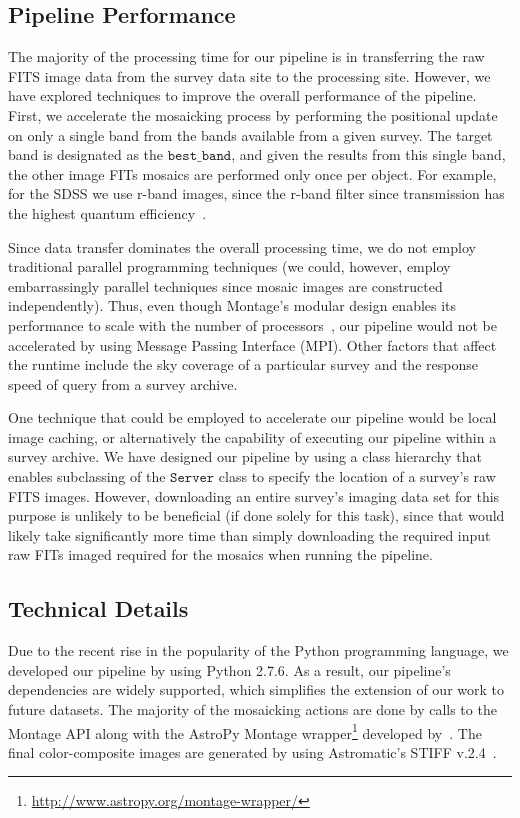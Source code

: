 \documentclass[authoryear, 12pt, 5p, times]{elsarticle}
\begin{document}
\subsection{Pipeline Performance}	

The majority of the processing time for our pipeline is in transferring the raw FITS image data from the survey data site to the processing site. However, we have explored techniques to improve the overall performance of the pipeline. First, we accelerate the mosaicking process by performing the positional update on only a single band from the bands available from a given survey. The target band is designated as the $\texttt{best\_band}$, and given the results from this single band, the other image FITs mosaics are performed only once per object. For example, for the SDSS we use r-band images, since the r-band filter since transmission has the highest quantum efficiency~\citep{edr}.

Since data transfer dominates the overall processing time, we do not employ traditional parallel programming techniques (we could, however, employ embarrassingly parallel techniques since mosaic images are constructed independently). Thus, even though Montage's modular design enables its performance to scale with the number of processors~\citep{montage}, our pipeline would not be accelerated by using  Message Passing Interface (MPI).  Other factors that affect the runtime include the sky coverage of a particular survey and the response speed of query from a survey archive.

One technique that could be employed to accelerate our pipeline would be local image caching, or alternatively the capability of executing our pipeline within a survey archive. We have designed our pipeline by using a class hierarchy that enables subclassing of the $\texttt{Server}$ class to specify the location of a survey's raw FITS images. However, downloading an entire survey's imaging data set for this purpose is unlikely to be beneficial (if done solely for this task), since that would likely take significantly more time than simply downloading the required input raw FITs imaged required for the mosaics when running the pipeline.

\subsection{Technical Details}

Due to the recent rise in the popularity of the Python programming language, we developed our pipeline by using Python 2.7.6. As a result, our pipeline's dependencies are widely supported, which simplifies the extension of our work to future datasets. The majority of the mosaicking actions are done by calls to the Montage API along with the AstroPy Montage wrapper\footnote{\url{http://www.astropy.org/montage-wrapper/}} developed by~\cite{montpy}. The final color-composite images are generated by using Astromatic's STIFF v.2.4~\citep{stiff}. 
\end{document}
